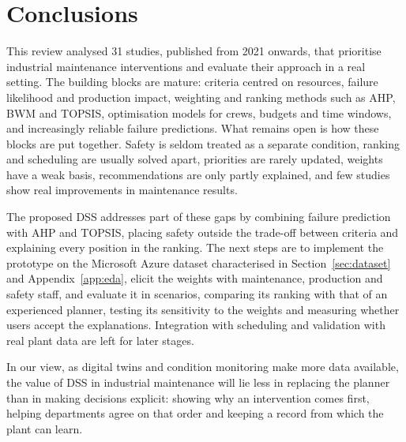 \section{Conclusions}
\label{sec:conclusions}

This review analysed 31 studies, published from 2021 onwards, that prioritise industrial maintenance interventions and evaluate their approach in a real setting. The building blocks are mature: criteria centred on resources, failure likelihood and production impact, weighting and ranking methods such as AHP, BWM and TOPSIS, optimisation models for crews, budgets and time windows, and increasingly reliable failure predictions. What remains open is how these blocks are put together. Safety is seldom treated as a separate condition, ranking and scheduling are usually solved apart, priorities are rarely updated, weights have a weak basis, recommendations are only partly explained, and few studies show real improvements in maintenance results.

The proposed DSS addresses part of these gaps by combining failure prediction with AHP and TOPSIS, placing safety outside the trade-off between criteria and explaining every position in the ranking. The next steps are to implement the prototype on the Microsoft Azure dataset characterised in Section~\ref{sec:dataset} and Appendix~\ref{app:eda}, elicit the weights with maintenance, production and safety staff, and evaluate it in scenarios, comparing its ranking with that of an experienced planner, testing its sensitivity to the weights and measuring whether users accept the explanations. Integration with scheduling and validation with real plant data are left for later stages.

In our view, as digital twins and condition monitoring make more data available, the value of DSS in industrial maintenance will lie less in replacing the planner than in making decisions explicit: showing why an intervention comes first, helping departments agree on that order and keeping a record from which the plant can learn.